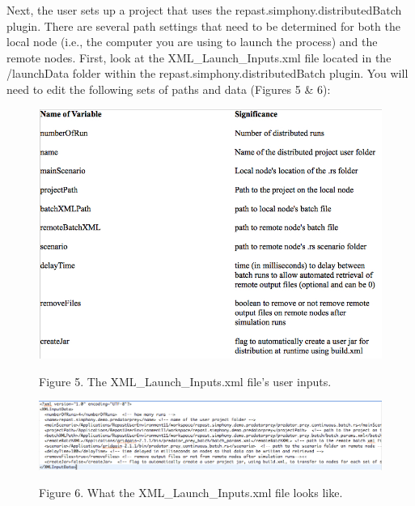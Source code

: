 \documentclass[12pt]{article}
\begin{document}
Next, the user sets up a project that uses the
repast.simphony.distributedBatch plugin. There are several path
settings that need to be determined for both the local node (i.e., the
computer you are using to launch the process) and the remote
nodes. First, look at the XML\_Launch\_Inputs.xml file located in the
/launchData folder within the repast.simphony.distributedBatch
plugin. You will need to edit the following sets of paths and data
(Figures 5 \& 6):

\begin{figure}[!t]
\begin{center}
\includegraphics [width=\textwidth]{images/Figure5.jpg}
\label{cablehealth}
\begin{minipage}{.9\textwidth}Figure 5. The XML\_Launch\_Inputs.xml file's user inputs.
\end{minipage}
\end{center}
\end{figure}

\begin{figure}[!t]
\begin{center}
\includegraphics [width=\textwidth]{images/Figure6.jpg}
\label{cablehealth}
\begin{minipage}{.9\textwidth}Figure 6. What the XML\_Launch\_Inputs.xml file looks like.
\end{minipage}
\end{center}
\end{figure}
\end{document}

